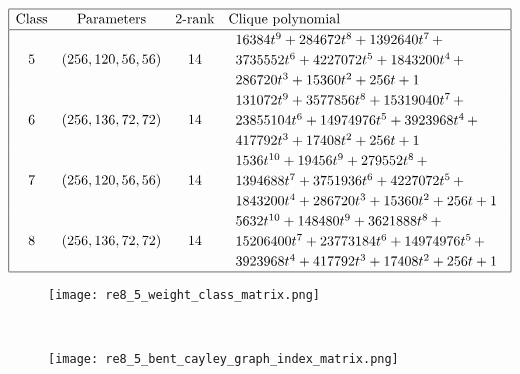 \documentclass[12pt,a4paper]{article}
\begin{document}
\begin{table}[!bhpt] %
\small{}
\begin{align*}
\def\arraystretch{1.2}
\begin{array}{|cccl|}
\hline
\text{Class} &
\text{Parameters} &
\text{2-rank} &
\text{Clique polynomial}
\\
\hline
5 &
(256, 120, 56, 56) &
14 &
\begin{array}{l}
16384t^{9} + 284672t^{8} + 1392640t^{7}
\,+
\\
 3735552t^{6} + 4227072t^{5} + 1843200t^{4}
\,+
\\
 286720t^{3} + 15360t^{2} + 256t + 1
\end{array}
\\
6 &
(256, 136, 72, 72) &
14 &
\begin{array}{l}
131072t^{9} + 3577856t^{8} + 15319040t^{7}
\,+
\\
 23855104t^{6} + 14974976t^{5} + 3923968t^{4}
\,+
\\
 417792t^{3} + 17408t^{2} + 256t + 1
\end{array}
\\
7 &
(256, 120, 56, 56) &
14 &
\begin{array}{l}
1536t^{10} + 19456t^{9} + 279552t^{8}
\,+
\\
 1394688t^{7} + 3751936t^{6} + 4227072t^{5}
\,+
\\
 1843200t^{4} + 286720t^{3} + 15360t^{2} + 256t + 1
\end{array}
\\
8 &
(256, 136, 72, 72) &
14 &
\begin{array}{l}
5632t^{10} + 148480t^{9} + 3621888t^{8}
\,+
\\
 15206400t^{7} + 23773184t^{6} + 14974976t^{5}
\,+
\\
 3923968t^{4} + 417792t^{3} + 17408t^{2} + 256t + 1
\end{array}
\\
\hline
\end{array}
\end{align*}
\caption{$[f_{8,5}]$ extended Cayley classes (part 2).}
\label{tab-c8_5_EC_classes_2}
\end{table}

\begin{figure}[!bhpt] %
\centering
\begin{minipage}{.48\textwidth}
  \centering
  \texttt{[image: re8\_5\_weight\_class\_matrix.png]}
  \label{fig:c8_5_weight_class_matrix}
\end{minipage}%
~~~~
\begin{minipage}{.48\textwidth}
  \centering
  \texttt{[image: re8\_5\_bent\_cayley\_graph\_index\_matrix.png]}
  \label{fig:c8_5_bent_cayley_graph_index_matrix}
\end{minipage}
\end{figure}
~
\end{document}
